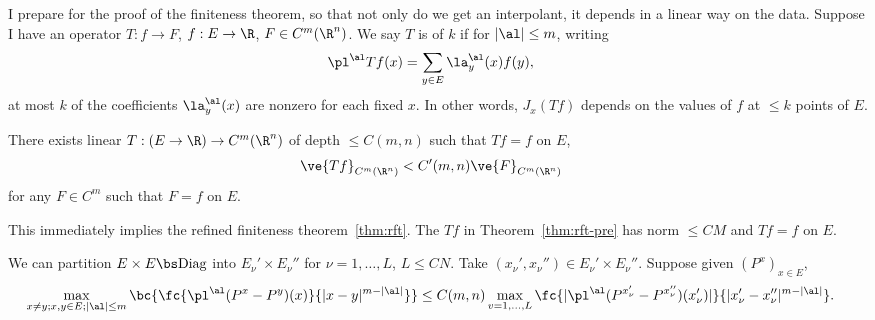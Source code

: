 I prepare for the proof of the finiteness theorem, so that not only do we get an interpolant, it depends in a linear way on the data. Suppose I have an operator $T:f\to F$, $f:E\to \R$, $F\in C^m(\R^n)$.  %
We say $T$ is of  $k$  if  for $|\al|\le m$, writing
\begin{align}
\pl^\al Tf(x) &= \sum_{y\in E} \la^\al_y(x) f(y),
\end{align}
at most $k$ of the coefficients $\la_y^\al(x)$ are nonzero for each fixed $x$. 
In other words, $J_x(Tf)$ depends on the values of $f$ at $\le k$ points of $E$.

\begin{thm}\label{thm:rft-pre}
There exists linear $T: (E\to \R) \to C^m(\R^n)$ of depth $\le C(m,n)$ such that $Tf=f$ on $E$, 
\begin{align}
\ve{Tf}_{C^m(\R^n)}&<C'(m,n)\ve{F}_{C^m(\R^n)}
\end{align}
for any $F\in C^m$ such that $F=f$ on $E$.
\end{thm}
This immediately  implies the refined finiteness theorem~\ref{thm:rft}. The $Tf$ in Theorem~\ref{thm:rft-pre} has norm $\le CM$ and $Tf=f$ on $E$. 

We can partition $E\times E\bs \text{Diag}$ into $E_\nu'\times E_\nu''$ for $\nu=1,\ldots, L$, $L\le CN$. Take $(x_\nu',x_\nu'')\in E_\nu'\times E_\nu''$. Suppose given $(P^x)_{x\in E}$,
\begin{align}
\max_{x\ne y; x,y\in E;|\al|\le m}
\bc{
\fc{\pl^\al(P^x-P^y)(x)}{|x-y|^{m-|\al|}}
}
&\le  C(m,n) \max_{v=1,\ldots, L}
\fc{|\pl^\al(P^{x_\nu'}-P^{x_\nu''})(x_\nu')|}{|x_\nu'-x_\nu''|^{m-|\al|}}.
\end{align}
